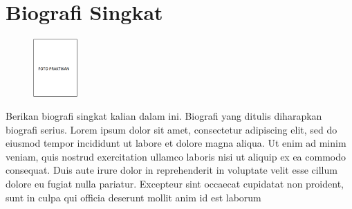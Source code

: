 \documentclass[conference]{IEEEtran}
\begin{document}

%
%
\hfill\\
\section*{Biografi Singkat}

\begin{figure} %
    \centering
    \includegraphics[width=0.15\textwidth]{./Figures/pas-foto.png}
\end{figure}

Berikan biografi singkat kalian dalam ini. Biografi yang ditulis diharapkan biografi serius. Lorem ipsum dolor sit amet, consectetur adipiscing elit, sed do eiusmod tempor incididunt ut labore et dolore magna aliqua. Ut enim ad minim veniam, quis nostrud exercitation ullamco laboris nisi ut aliquip ex ea commodo consequat. Duis aute irure dolor in reprehenderit in voluptate velit esse cillum dolore eu fugiat nulla pariatur. Excepteur sint occaecat cupidatat non proident, sunt in culpa qui officia deserunt mollit anim id est laborum
\end{document}

